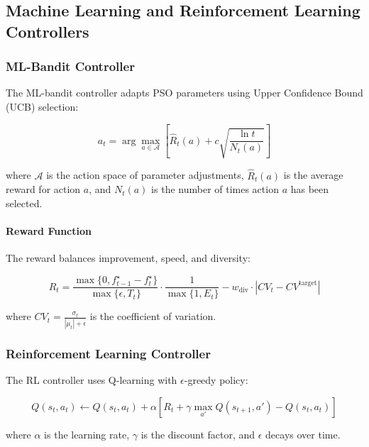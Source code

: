 \documentclass[12pt,a4paper]{article}
\begin{document}
\subsection{Machine Learning and Reinforcement Learning Controllers}

\subsubsection{ML-Bandit Controller}

The ML-bandit controller adapts PSO parameters using Upper Confidence Bound (UCB) selection:

\begin{equation}
a_t = \arg\max_{a \in \mathcal{A}} \left[ \hat{R}_t(a) + c \sqrt{\frac{\ln t}{N_t(a)}} \right] \label{eq:ml_bandit_selection}
\end{equation}

where $\mathcal{A}$ is the action space of parameter adjustments, $\hat{R}_t(a)$ is the average reward for action $a$, and $N_t(a)$ is the number of times action $a$ has been selected.

\paragraph{Reward Function}
The reward balances improvement, speed, and diversity:

\begin{equation}
R_t = \frac{\max\{0, f_{t-1}^{\star} - f_t^{\star}\}}{\max\{\epsilon, T_t\}} \cdot \frac{1}{\max\{1, E_t\}} - w_{\text{div}} \cdot |CV_t - CV^{\text{target}}| \label{eq:ml_bandit_reward}
\end{equation}

where $CV_t = \frac{\sigma_t}{|\mu_t| + \epsilon}$ is the coefficient of variation.

\subsubsection{Reinforcement Learning Controller}

The RL controller uses Q-learning with $\epsilon$-greedy policy:

\begin{equation}
Q(s_t, a_t) \leftarrow Q(s_t, a_t) + \alpha [R_t + \gamma \max_{a'} Q(s_{t+1}, a') - Q(s_t, a_t)] \label{eq:rl_q_update}
\end{equation}

where $\alpha$ is the learning rate, $\gamma$ is the discount factor, and $\epsilon$ decays over time.
\end{document}
